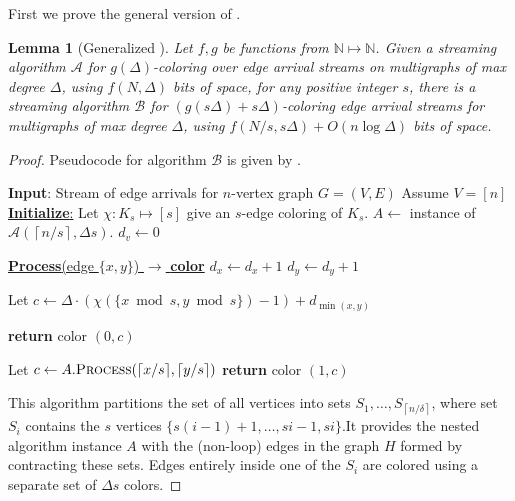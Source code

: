 \documentclass[10pt]{article}
\newtheorem{lemma}[theorem]{Lemma}
\theoremstyle{definition}\newtheorem{definition}[lemma]{Definition}
\theoremstyle{remark}  \newtheorem*{remark}{Remark}
\newcommand{\NN}{\mathbb{N}}
\newcommand{\cA}{\mathcal{A}}
\newcommand{\cB}{\mathcal{B}}
\newcommand{\ceil}[1]{{\left\lceil{#1}\right\rceil}}
\begin{document}
First we prove the general version of .

\begin{lemma}[Generalized ]\label{lem:space-color-tradeoff-formal}
  Let $f, g$ be functions from $\NN \mapsto \NN$.
 Given a streaming algorithm $\cA$ for $g(\Delta)$-coloring over edge arrival streams on multigraphs of max degree $\Delta$, using $f(N,\Delta)$ bits of space, for any positive integer $s$, there is a streaming algorithm $\cB$ for $(g(s \Delta) + s\Delta)$-coloring edge arrival streams for multigraphs of max degree $\Delta$, using $f(N / s, s \Delta) + O(n \log \Delta)$ bits of space.
\end{lemma}

\begin{proof} Pseudocode for algorithm $\cB$ is given by .

  \begin{algorithm}[htb!]
    \caption{Adapting edge coloring algorithm $\cB$ to use more colors and less space, with parameter $s$ \label{alg:space-color-exch}}
    \begin{algorithmic}[1]
    \Statex \textbf{Input}: Stream of edge arrivals for $n$-vertex graph $G=(V,E)$
      \Statex Assume $V = [n]$
      \Statex
      \Statex \underline{\textbf{Initialize}:}
      \Statex Let $\chi : K_s \mapsto [s]$ give an $s$-edge coloring of $K_s$.\footnotemark
      \State $A \gets $ instance of $\cA(\ceil{n/s}, \Delta s)$.
          \State $d_v \gets 0$
      \EndFor
      
    \Statex \underline{\textbf{Process}(edge $\{x,y\}$) $\rightarrow$ \textbf{color}}
      \State $d_x \gets d_x + 1$
      \State $d_y \gets d_y + 1$

      \If{ $\ceil{x / s} = \ceil{y / s}$}
        \State Let $c \gets \Delta \cdot (\chi(\{x \bmod s, y \bmod s\}) - 1) + d_{\min(x,y)}$ 
        
        \State \textbf{return} color $(0, c)$
      \EndIf
      
      \State Let $c \gets A.\textsc{Process}( {\ceil{x/s}, \ceil{y/s}} )$
      \State \textbf{return} color $(1,c)$
    \end{algorithmic}
  \end{algorithm}
  
  This algorithm partitions the set of all vertices into sets $S_1,\ldots,S_{\ceil{n/\delta}}$,
  where set $S_i$ contains the $s$ vertices $\{s (i - 1) + 1, \ldots, s i - 1, s i\}$.It provides the nested algorithm instance $A$ with the (non-loop) edges in the graph $H$ formed by contracting these sets. Edges entirely inside one of the $S_i$ are colored using a separate set of $\Delta s$ colors.


\end{proof}
\end{document}
